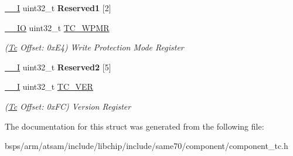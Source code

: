 \begin{DoxyCompactItemize}
\mbox{\label{structTc_a83561fc9b1d44c1d21ccaf750019fddc}} 
\mbox{\hyperlink{core__cm7_8h_af63697ed9952cc71e1225efe205f6cd3}{\+\_\+\+\_\+I}} uint32\+\_\+t {\bfseries Reserved1} \mbox{[}2\mbox{]}
\item 
\mbox{\label{structTc_aae1f7f0f396426804c11a9ff19f253ef}} 
\mbox{\hyperlink{core__cm7_8h_aec43007d9998a0a0e01faede4133d6be}{\+\_\+\+\_\+\+IO}} uint32\+\_\+t \mbox{\hyperlink{structTc_aae1f7f0f396426804c11a9ff19f253ef}{T\+C\+\_\+\+W\+P\+MR}}
\begin{DoxyCompactList}\small\item\em (\mbox{\hyperlink{structTc}{Tc}} Offset\+: 0x\+E4) Write Protection Mode Register \end{DoxyCompactList}\item 
\mbox{\label{structTc_a6a6acfe33e14a7d0b269388db27185fc}} 
\mbox{\hyperlink{core__cm7_8h_af63697ed9952cc71e1225efe205f6cd3}{\+\_\+\+\_\+I}} uint32\+\_\+t {\bfseries Reserved2} \mbox{[}5\mbox{]}
\item 
\mbox{\label{structTc_ad1260b668d8c960e0155124fe0f2290d}} 
\mbox{\hyperlink{core__cm7_8h_af63697ed9952cc71e1225efe205f6cd3}{\+\_\+\+\_\+I}} uint32\+\_\+t \mbox{\hyperlink{structTc_ad1260b668d8c960e0155124fe0f2290d}{T\+C\+\_\+\+V\+ER}}
\begin{DoxyCompactList}\small\item\em (\mbox{\hyperlink{structTc}{Tc}} Offset\+: 0x\+FC) Version Register \end{DoxyCompactList}\end{DoxyCompactItemize}


The documentation for this struct was generated from the following file\+:\begin{DoxyCompactItemize}
\item 
bsps/arm/atsam/include/libchip/include/same70/component/component\+\_\+tc.\+h\end{DoxyCompactItemize}
